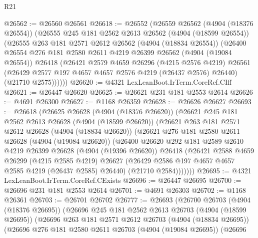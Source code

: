\begin{lexlean}{R21}
\begin{coremodule}
@26562 := @26560 @26561
@26618 := @26552
    (@26559
      @26562
      (@4904 (@18376 @26554))
      (@26555
        @245
        @181
        @2562
        @2613
        @26562
        (@4904 (@18599 @26554))
        (@26555
          @263
          @181
          @2571
          @2612
          @26562
          (@4904 (@18834 @26554))
          (@26400
            @26554
            @276
            @181
            @2580
            @2611
            @4219
            @26399
            @26562
            (@4904 (@19084 @26554))
            @26418
            (@26421
              @2579
              @4659
              @26296
              (@4215 @2576 @4219)
              @26561
              (@26429 @2577 @197 @4657 @4657 @2576 @4219 (@26437 @2576) @26440)
              (@21710 @2575))))))
@26620 := @4321 LexLeanBoot.IrTerm.CoreRef.CIff
@26621 := @26447 @26620
@26625 := @26621 @231 @181 @2553 @2614
@26626 := @4691 @26300
@26627 := @1168 @26359
@26628 := @26626 @26627
@26693 := @26618
    (@26625
      @26628
      (@4904 (@18376 @26620))
      (@26621
        @245
        @181
        @2562
        @2613
        @26628
        (@4904 (@18599 @26620))
        (@26621
          @263
          @181
          @2571
          @2612
          @26628
          (@4904 (@18834 @26620))
          (@26621
            @276
            @181
            @2580
            @2611
            @26628
            (@4904 (@19084 @26620))
            (@26400
              @26620
              @292
              @181
              @2589
              @2610
              @4219
              @26399
              @26628
              (@4904 (@19396 @26620))
              @26418
              (@26421
                @2588
                @4659
                @26299
                (@4215 @2585 @4219)
                @26627
                (@26429 @2586 @197 @4657 @4657 @2585 @4219 (@26437 @2585) @26440)
                (@21710 @2584)))))))
@26695 := @4321 LexLeanBoot.IrTerm.CoreRef.CExists
@26696 := @26447 @26695
@26700 := @26696 @231 @181 @2553 @2614
@26701 := @4691 @26303
@26702 := @1168 @26361
@26703 := @26701 @26702
@26777 := @26693
    (@26700
      @26703
      (@4904 (@18376 @26695))
      (@26696
        @245
        @181
        @2562
        @2613
        @26703
        (@4904 (@18599 @26695))
        (@26696
          @263
          @181
          @2571
          @2612
          @26703
          (@4904 (@18834 @26695))
          (@26696
            @276
            @181
            @2580
            @2611
            @26703
            (@4904 (@19084 @26695))
            (@26696

\end{coremodule}
\end{lexlean}
